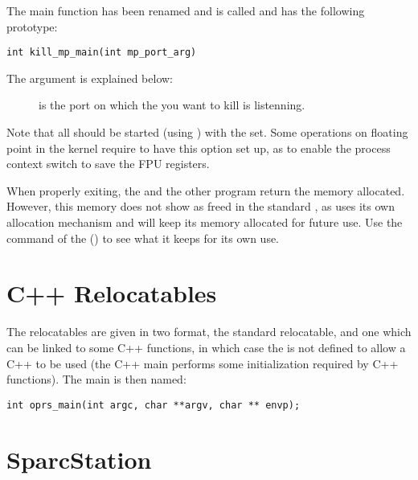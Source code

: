 The  main function has been renamed and is called
 and has the following prototype:

\begin{verbatim}
int kill_mp_main(int mp_port_arg)
\end{verbatim}

The argument is explained below:

\begin{description}

\item[] is the port on which the \MP{} you want
to kill is listenning.

\end{description}

Note that all \CPK{} should be started (using ) with the
 set. Some operations on floating point in the kernel require
to have this option set up, as to enable the process context switch to save the
FPU registers.

When properly exiting, the \CPK{} and the other \COPRSDE{} program return the
memory allocated. However, this memory does not show as freed in the standard
, as \CPK{} uses its own allocation mechanism and will keep its
memory allocated for future use. Use the  command of the
\CPK{} () to see what it keeps for
its own use. 


\section{C++ Relocatables}

The relocatables are given in two format, the standard relocatable, and one
which can be linked to some C++ functions, in which case the  is not
defined to allow a C++  to be used (the C++ main performs some
initialization required by C++ functions). The main is then named:

\begin{verbatim}
int oprs_main(int argc, char **argv, char ** envp);
\end{verbatim}

\section{SparcStation}

